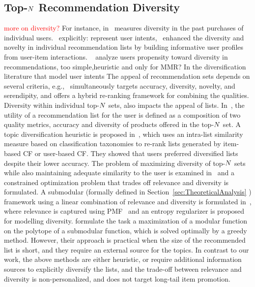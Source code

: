\fi


\iffalse
\subsection{Top-$N$ Recommendation Diversity}  

\textcolor{red}{more on diversity?}
For instance, in~\cite{yin2012challenging} measures diversity in the past purchases of individual users.~\cite{zhang2008avoiding} explicitly: represent user intents,~\cite{lacerda2013building} enhanced the diversity and novelty in individual recommendation lists by building informative user profiles from user-item interactions. ~\cite{di2014analysis} analyze users propensity toward diversity in recommendations, too simple,heuristic and only for MMR? In the diversification literature that model user intents
The appeal of recommendation sets depends on  several criteria, e.g.,~\cite{zhang2012auralist} simultaneously targets accuracy, diversity, novelty, and serendipity, and offers a hybrid re-ranking framework for combining the qualities.  Diversity within individual top-$N$ sets, also impacts the appeal of lists. In~\cite{ziegler2005improving}, the utility of a recommendation list for the user is defined as a composition  of  two quality metrics, accuracy  and diversity of products offered in the top-$N$ set. %
A topic diversification heuristic is proposed in~\cite{ziegler2005improving}, which uses an intra-list similarity measure based on classification taxonomies to re-rank lists generated by item-based CF  or user-based CF. They showed that users preferred diversified lists despite their lower accuracy. The problem of maximizing diversity of  top-$N$ sets while also maintaining adequate similarity to the user is examined in~\cite{zhang2008avoiding} and a constrained optimization problem that trades off relevance and diversity is formulated. A submodular (formally defined in Section~\ref{sec:TheoreticalAnalysis}
) framework using a linear combination of relevance and diversity is formulated in~\cite{qin2013promoting}, where  relevance is captured using PMF~\cite{mnih2007probabilistic} and an entropy regularizer is proposed for modelling diversity. \cite{ashkan2015optimal} formulate the task a maximization of a modular function on the polytope of a submodular function, which is solved optimally by a greedy method. However, their approach is practical when the size of the recommended list is short, and they require an external source for the topics. In contrast to our work, the above methods are either heuristic, or require additional information sources to explicitly diversify the lists, and   the trade-off between relevance and diversity  is non-personalized, and does not target long-tail item promotion. %
